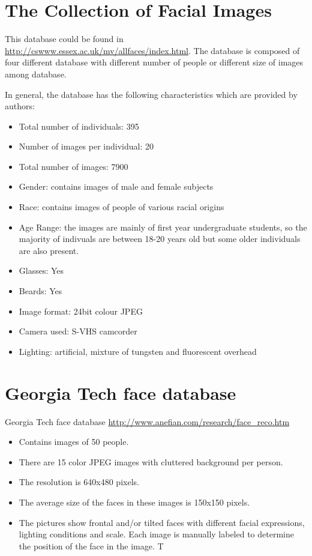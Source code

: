 \documentclass[a4paper]{article}
\begin{document}
\section{The Collection of Facial Images}
This database could be found in \url{http://cswww.essex.ac.uk/mv/allfaces/index.html}. The database is composed of four different database with different number of people or different size of images among database.

In general, the database has the following characteristics which are provided by authors:

\begin{itemize}
\item Total number of individuals: 395
\item Number of images per individual: 20
\item Total number of images: 7900
\item Gender:  contains images of male and female subjects
\item Race:  contains images of people of various racial origins
\item Age Range:  the images are mainly of first year undergraduate  students, so the majority of indivuals are between 18-20 years old but some older individuals are also present.
\item Glasses: Yes
\item Beards: Yes
\item Image format: 24bit colour JPEG
\item Camera used: S-VHS camcorder
\item Lighting: artificial, mixture of tungsten and fluorescent overhead

\end{itemize} 

\section{Georgia Tech face database}
Georgia Tech face database \url{http://www.anefian.com/research/face_reco.htm}

\begin{itemize}
\item Contains images of 50 people.
\item There are 15 color JPEG images with cluttered background per person.
\item The resolution is 640x480 pixels. 
\item The average size of the faces in these images is 150x150 pixels.
\item The pictures show frontal and/or tilted faces with different facial expressions, lighting conditions and scale. Each image is manually labeled to determine the position of the face in the image. T
\end{itemize}
\end{document}
